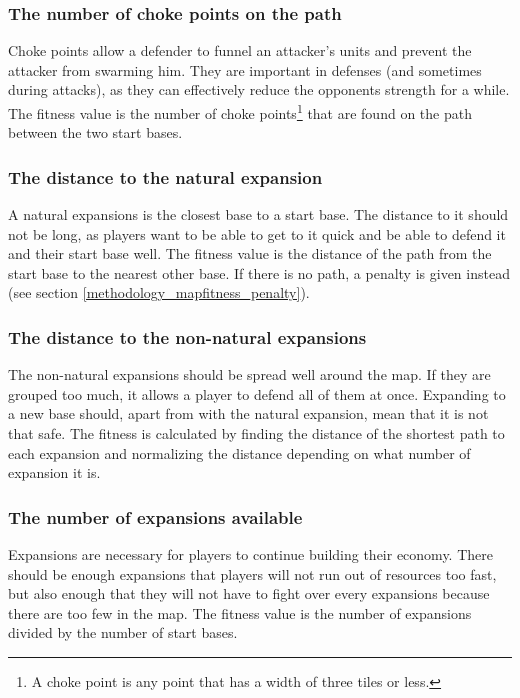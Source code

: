 	\subsubsection*{The number of choke points on the path}
	Choke points allow a defender to funnel an attacker's units and prevent the attacker from swarming him. They are important in defenses (and sometimes during attacks), as they can effectively reduce the opponents strength for a while. The fitness value is the number of choke points\footnote{A choke point is any point that has a width of three tiles or less.} that are found on the path between the two start bases.

	\subsubsection*{The distance to the natural expansion}
	A natural expansions is the closest base to a start base. The distance to it should not be long, as players want to be able to get to it quick and be able to defend it and their start base well. The fitness value is the distance of the path from the start base to the nearest other base. If there is no path, a penalty is given instead (see section \ref{methodology_mapfitness_penalty}).

	\subsubsection*{The distance to the non-natural expansions}
	The non-natural expansions should be spread well around the map. If they are grouped too much, it allows a player to defend all of them at once. Expanding to a new base should, apart from with the natural expansion, mean that it is not that safe. The fitness is calculated by finding the distance of the shortest path to each expansion and normalizing the distance depending on what number of expansion it is.

	\subsubsection*{The number of expansions available}
	Expansions are necessary for players to continue building their economy. There should be enough expansions that players will not run out of resources too fast, but also enough that they will not have to fight over every expansions because there are too few in the map. The fitness value is the number of expansions divided by the number of start bases.

